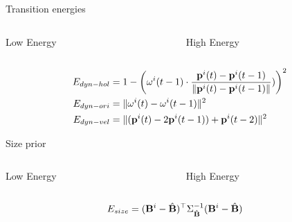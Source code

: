 \begin{frame}{Transition energies}
  \begin{columns}
    \begin{column}{0.5\textwidth}
      \centering
      Low Energy\\
    \end{column}
    \begin{column}{0.5\textwidth}
      \centering
      High Energy\\
      
    \end{column}
  \end{columns}
\begin{align}
  \label{eq:totalPosTransitionEnergy}
  E_{dyn-hol} &= 1 - \left(\mathbf{\omega}^{i}(t-1) \cdot \frac{\mathbf{p}^{i}({t}) - \mathbf{p}^{i}({t-1})}{\|\mathbf{p}^{i}({t}) - \mathbf{p}^{i}({t-1})\|})\right)^2 \\
  E_{dyn-ori} &= \|\mathbf{\omega}^{i}(t) - \mathbf{\omega}^{i}(t-1)\|^2\\ 
  E_{dyn-vel} &= \|(\mathbf{p}^{i}({t}) - 2\mathbf{p}^{i}({t-1})) + \mathbf{p}^{i}({t-2})\|^2
\end{align}
\end{frame}


\begin{frame}{Size prior}
  
  \begin{columns}
    \begin{column}{0.5\textwidth}
      \centering
      Low Energy\\
      \goodsizeconfig
    \end{column}

    \begin{column}{0.5\textwidth}
      \centering
      High Energy\\
      \badsizeconfig
    \end{column}
  \end{columns}
\begin{align}
  \label{eq:totalSizeEnergy}
  E_{size} &= (\mathbf{B}^{i} - \hat{\mathbf{B}})^\top\Sigma_{\hat{\mathbf{B}}}^{-1}(\mathbf{B}^{i} -
  \hat{\mathbf{B}})
\end{align}
\end{frame}
